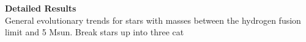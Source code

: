 \textbf{Detailed Results} \\
General evolutionary trends for stars with masses between the hydrogen fusion limit and 5 Msun. Break stars up into three cat